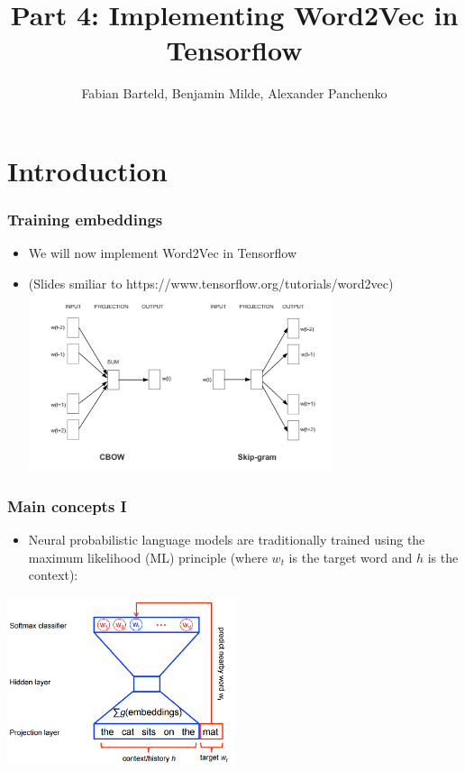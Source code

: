 \documentclass{beamer}
\title{Part 4: Implementing Word2Vec in Tensorflow}
\author{Fabian Barteld, Benjamin Milde, Alexander Panchenko}
\begin{document}
\maketitle

%
%

\section{Introduction}

\begin{frame}[fragile]
\frametitle{Training embeddings}
  \begin{itemize}
	\item We will now implement Word2Vec in Tensorflow
	\item (Slides smiliar to https://www.tensorflow.org/tutorials/word2vec)
	\includegraphics[width=0.7\textwidth]{04_skipgram_vs_cbow}
  \end{itemize}
\end{frame}

\begin{frame}
  \frametitle{Main concepts I}
  \begin{itemize}
     
    \item  Neural probabilistic language models are traditionally trained using the maximum likelihood (ML) principle (where $w_t$ is the target word and $h$ is the context):
	 
	 \end{itemize}

\begin{center}
\includegraphics[width=0.5\textwidth]{04_w2v_01}
\end{center}	 
	 
\end{frame}
\end{document}
